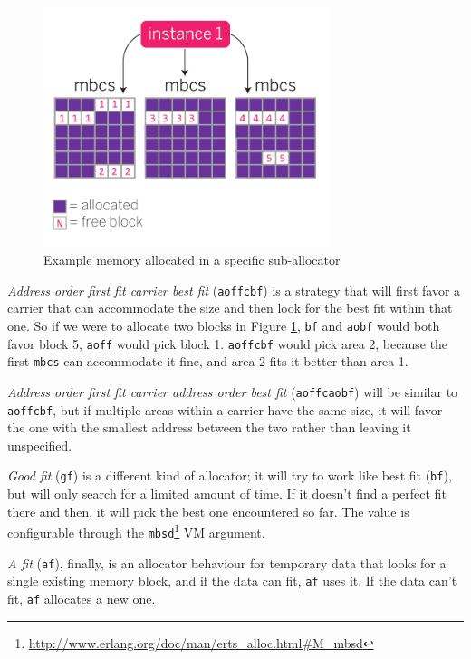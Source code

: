 \documentclass[11pt, oneside]{book}   	%
\newcommand{\term}[1]{\Verb`#1`}
\begin{document}
\begin{figure}
  \includegraphics[max height=7cm]{allocation-strategy-2.pdf}%
  \centering%
  \caption{Example memory allocated in a specific sub-allocator}%
   \label{fig:allocation-strategy-2}
\end{figure}
\FloatBarrier

\emph{Address order first fit carrier best fit} (\term{aoffcbf}) is a strategy that will first favor a carrier that can accommodate the size and then look for the best fit within that one. So if we were to allocate two blocks in Figure \ref{fig:allocation-strategy-2}, \term{bf} and \term{aobf} would both favor block 5, \term{aoff} would pick block 1. \term{aoffcbf} would pick area 2, because the first \term{mbcs} can accommodate it fine, and area 2 fits it better than area 1.

\emph{Address order first fit carrier address order best fit} (\term{aoffcaobf}) will be similar to \term{aoffcbf}, but if multiple areas within a carrier have the same size, it will favor the one with the smallest address between the two rather than leaving it unspecified.

\emph{Good fit} (\term{gf}) is a different kind of allocator; it will try to work like best fit (\term{bf}), but will only search for a limited amount of time. If it doesn't find a perfect fit there and then, it will pick the best one encountered so far. The value is configurable through the \term{mbsd}\footnote{\href{http://www.erlang.org/doc/man/erts\_alloc.html\#M\_mbsd}{http://www.erlang.org/doc/man/erts\_alloc.html\#M\_mbsd}} VM argument.

\emph{A fit} (\term{af}), finally, is an allocator behaviour for temporary data that looks for a single existing memory block, and if the data can fit, \term{af} uses it. If the data can't fit, \term{af} allocates a new one.
\end{document}
